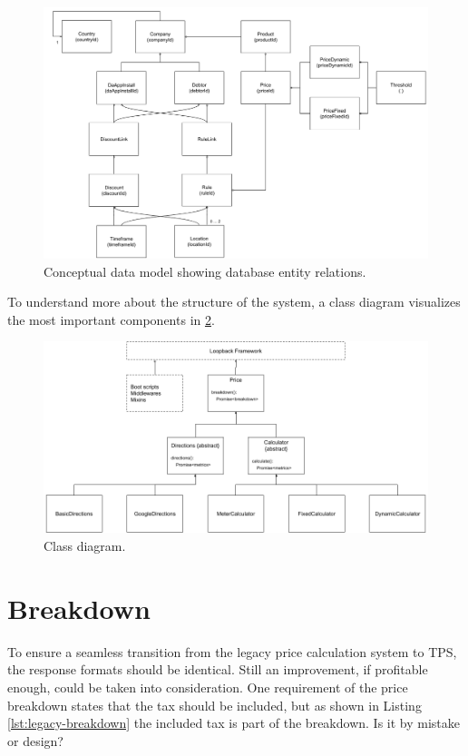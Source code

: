 \begin{figure}[H]
	\centering
	\includegraphics[width=1\textwidth]{DataModel}
	\caption[DataModel]{Conceptual data model showing database entity relations.}
	\label{fig:DataModel}
\end{figure}

To understand more about the structure of the system, a class diagram visualizes the most important components in \ref{fig:ClassDiagram}.

\begin{figure}[H]
	\centering
	\includegraphics[width=1\textwidth]{ClassDiagram}
	\caption[Class Diagram]{Class diagram.}
	\label{fig:ClassDiagram}
\end{figure}

%
\section{Breakdown}
To ensure a seamless transition from the legacy price calculation system to TPS, the response formats should be identical. Still an improvement, if profitable enough, could be taken into consideration. One requirement of the price breakdown states that the tax should be included, but as shown in Listing \ref{lst:legacy-breakdown} the included tax is part of the breakdown. Is it by mistake or design?

